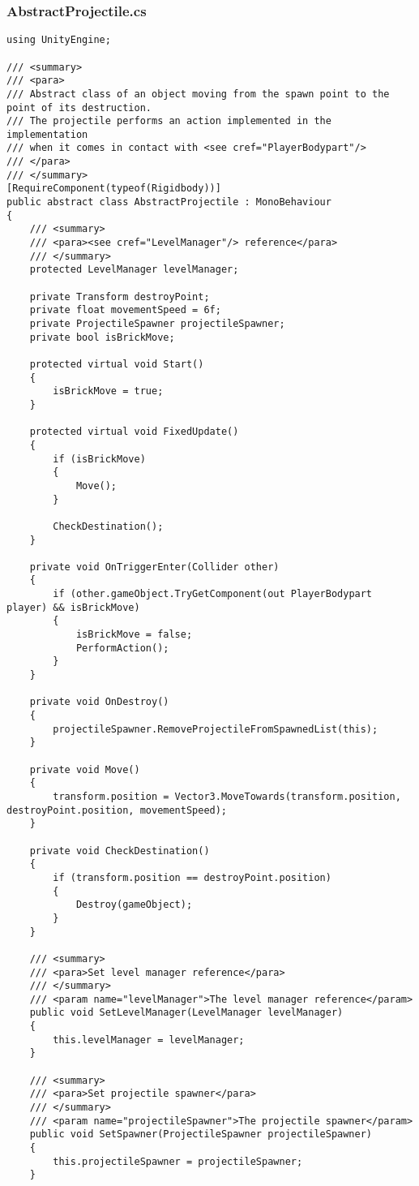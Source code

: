 \subsubsection*{AbstractProjectile.cs}
\begin{verbatim}
using UnityEngine;

/// <summary>
/// <para>
/// Abstract class of an object moving from the spawn point to the point of its destruction.
/// The projectile performs an action implemented in the implementation
/// when it comes in contact with <see cref="PlayerBodypart"/>
/// </para>
/// </summary>
[RequireComponent(typeof(Rigidbody))]
public abstract class AbstractProjectile : MonoBehaviour
{
    /// <summary>
    /// <para><see cref="LevelManager"/> reference</para>
    /// </summary>
    protected LevelManager levelManager;

    private Transform destroyPoint;
    private float movementSpeed = 6f;
    private ProjectileSpawner projectileSpawner;
    private bool isBrickMove;

    protected virtual void Start()
    {
        isBrickMove = true;
    }

    protected virtual void FixedUpdate()
    {
        if (isBrickMove)
        {
            Move();
        }

        CheckDestination();
    }

    private void OnTriggerEnter(Collider other)
    {
        if (other.gameObject.TryGetComponent(out PlayerBodypart player) && isBrickMove)
        {
            isBrickMove = false;
            PerformAction();
        }
    }

    private void OnDestroy()
    {
        projectileSpawner.RemoveProjectileFromSpawnedList(this);
    }

    private void Move()
    {
        transform.position = Vector3.MoveTowards(transform.position, destroyPoint.position, movementSpeed);
    }

    private void CheckDestination()
    {
        if (transform.position == destroyPoint.position)
        {
            Destroy(gameObject);
        }
    }

    /// <summary>
    /// <para>Set level manager reference</para>
    /// </summary>
    /// <param name="levelManager">The level manager reference</param>
    public void SetLevelManager(LevelManager levelManager)
    {
        this.levelManager = levelManager;
    }

    /// <summary>
    /// <para>Set projectile spawner</para>
    /// </summary>
    /// <param name="projectileSpawner">The projectile spawner</param>
    public void SetSpawner(ProjectileSpawner projectileSpawner)
    {
        this.projectileSpawner = projectileSpawner;
    }


\end{verbatim}
